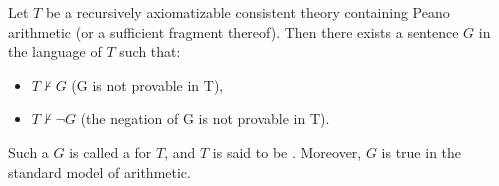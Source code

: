 Let $T$ be a recursively axiomatizable consistent theory containing Peano arithmetic (or a sufficient fragment thereof). Then there exists a sentence $G$ in the language of $T$ such that:
\begin{itemize}
\item $T \not\vdash G$ (G is not provable in T),
\item $T \not\vdash \neg G$ (the negation of G is not provable in T).
\end{itemize}
Such a $G$ is called a  for $T$, and $T$ is said to be . Moreover, $G$ is true in the standard model of arithmetic.
